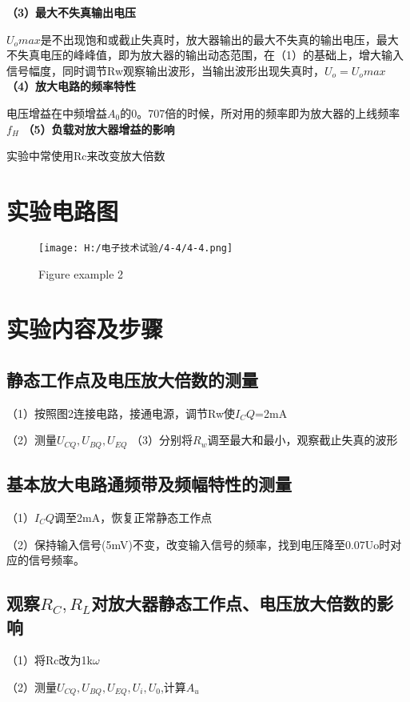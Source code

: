 \documentclass{article}
\begin{document}
	\textbf{（3）最大不失真输出电压}\par
	$U_omax$是不出现饱和或截止失真时，放大器输出的最大不失真的输出电压，最大不失真电压的峰峰值，即为放大器的输出动态范围，在（1）的基础上，增大输入信号幅度，同时调节Rw观察输出波形，当输出波形出现失真时，$U_o=U_omax$
    	\textbf{（4）放大电路的频率特性}\par
		电压增益在中频增益$A_0$的0。707倍的时候，所对用的频率即为放大器的上线频率$f_H$
		\textbf{（5）负载对放大器增益的影响}\par
         实验中常使用Rc来改变放大倍数
		\section{ 实验电路图}
		\begin{figure}[h]
		\centering
		\texttt{[image: H:/电子技术试验/4-4/4-4.png]}
		\caption{Figure example 2} \label{fig:aa}
	\end{figure}
\section{ 实验内容及步骤}
\subsection {静态工作点及电压放大倍数的测量}
（1）按照图2连接电路，接通电源，调节Rw使$I_CQ$=2mA  \par
（2）测量$U_{CQ},U_{BQ},U_{EQ}$
（3）分别将$R_w$调至最大和最小，观察截止失真的波形
\subsection{基本放大电路通频带及频幅特性的测量}
（1）$I_CQ$调至2mA，恢复正常静态工作点\par
（2）保持输入信号(5mV)不变，改变输入信号的频率，找到电压降至0.07Uo时对应的信号频率。
\subsection{观察$R_C,R_L$对放大器静态工作点、电压放大倍数的影响}
（1）将Rc改为1k$\omega$\par
（2）测量$U_{CQ},U_{BQ},U_{EQ},U_i,U_0$,计算$A_u$
\end{document}

